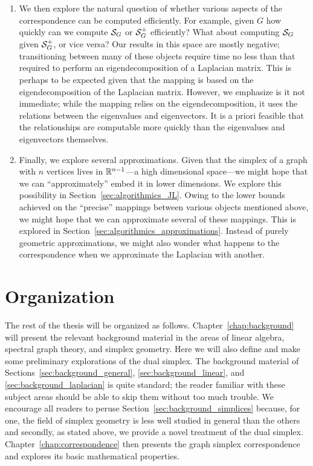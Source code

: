 \begin{itemize}
\begin{enumerate}
		\item We then explore the natural question of whether various aspects of the correspondence can be computed efficiently. For example, given $G$ how quickly can we compute $\mathcal{S}_G$ or $\mathcal{S}_G^+$ efficiently? What about computing $\mathcal{S}_G$ given $\mathcal{S}_G^+$, or vice  versa? Our results in this  space are mostly negative; transitioning between many of these objects require time no less than that required to perform an eigendecomposition of a Laplacian matrix. 
		This is perhaps to be expected given that the mapping is based on the eigendecomposition of the Laplacian matrix. 
		However, we emphasize is it not immediate; while the mapping relies on the eigendecomposition, it uses the relations between the eigenvalues and eigenvectors. It is a priori  feasible that the relationships are computable  more quickly than the eigenvalues and eigenvectors  themselves. 
		\item Finally, we explore several approximations. Given that  the simplex of a graph with $n$ vertices lives in $\mathbb{R}^{n-1}$---a high dimensional  space---we might hope that we can ``approximately'' embed it  in  lower dimensions. We explore this possibility in Section~\ref{sec:algorithmics_JL}. Owing to the lower bounds achieved on the ``precise'' mappings between various objects mentioned above, we might hope that we can approximate several of these mappings. This is explored in Section~\ref{sec:algorithmics_approximations}. 
		Instead of purely geometric approximations, we might also wonder what happens to the correspondence when we approximate the Laplacian with another. 
	\end{enumerate}

\end{itemize}

\section{Organization}
\label{sec:intro_organization}

The rest of the thesis will be  organized as follows. Chapter~\ref{chap:background} will present the relevant background material in the areas of linear algebra, spectral graph theory, and simplex  geometry. Here we will also define and make some preliminary explorations of the dual simplex. The  background material  of Sections~\ref{sec:background_general}, \ref{sec:background_linear},  and \ref{sec:background_laplacian} is quite standard; the reader familiar with  these subject areas should  be able to skip  them without too much trouble. We  encourage all readers to peruse Section~\ref{sec:background_simplices} because, for one, the field  of simplex geometry is  less  well  studied  in general than the others and secondly, as stated above, we provide a novel treatment of  the dual simplex. Chapter~\ref{chap:correspondence} then presents the  graph  simplex correspondence and explores its  basic mathematical properties.  



